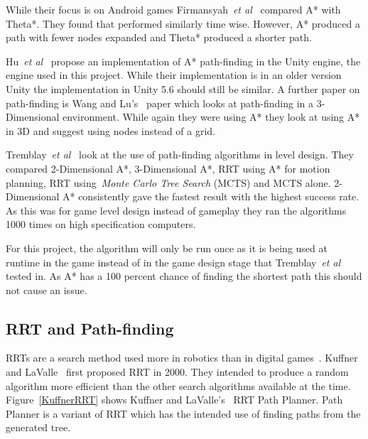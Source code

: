 \documentclass[journal]{IEEEtran}
\begin{document}
	While their focus is on Android games Firmansyah~\textit{et al}~\cite{Firmansyah2016} compared A* with Theta*. They found that performed similarly time wise. However, A* produced a path with fewer nodes expanded and Theta* produced a shorter path. 
	
	Hu~\textit{et al}~\cite{Hu2012} propose an implementation of A* path-finding in the Unity engine, the engine used in this project.  While their implementation is in an older version Unity the implementation in Unity 5.6 should still be similar. A further paper on path-finding is Wang and Lu's~\cite{wang2012} paper which looks at path-finding in a 3-Dimensional environment. While again they were using A* they look at using A* in 3D and suggest using nodes instead of a grid.
	
	Tremblay~\textit{et al}~\cite{Tremblay2014} look at the use of path-finding algorithms in level design. They compared 2-Dimensional A*, 3-Dimensional A*, RRT using A* for motion planning, RRT using~\textit{Monte Carlo Tree Search} (MCTS) and MCTS alone. 2-Dimensional A* consistently gave the fastest result with the highest success rate. As this was for game level design instead of gameplay they ran the algorithms 1000 times on high specification computers. 
	
	For this project, the algorithm will only be run once as it is being used at runtime in the game instead of in the game design stage that Tremblay~\textit{et al}~\cite{Tremblay2014} tested in. As A* has a 100 percent chance of finding the shortest path this should not cause an issue. 
	
	\subsection{RRT and Path-finding} \label{RRTadnPathfinding}
	RRTs are a search method used more in robotics than in digital games~\cite{LaValle1998, Kuffner2000}. Kuffner and LaValle~\cite{Kuffner2000} first proposed RRT in 2000. They intended to produce a random algorithm more efficient than the other search algorithms available at the time.  Figure~\ref{KuffnerRRT} shows Kuffner and LaValle's~\cite{Kuffner2000} RRT Path Planner. Path Planner is a variant of RRT which has the intended use of finding paths from the generated tree.
	
\end{document}
